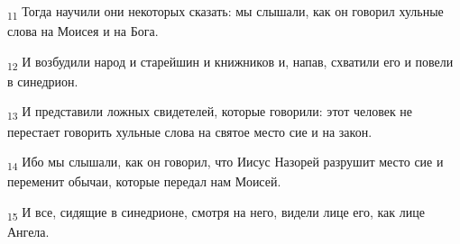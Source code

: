 \begin{tcolorbox}
\textsubscript{11} Тогда научили они некоторых сказать: мы слышали, как он говорил хульные слова на Моисея и на Бога.
\end{tcolorbox}
\begin{tcolorbox}
\textsubscript{12} И возбудили народ и старейшин и книжников и, напав, схватили его и повели в синедрион.
\end{tcolorbox}
\begin{tcolorbox}
\textsubscript{13} И представили ложных свидетелей, которые говорили: этот человек не перестает говорить хульные слова на святое место сие и на закон.
\end{tcolorbox}
\begin{tcolorbox}
\textsubscript{14} Ибо мы слышали, как он говорил, что Иисус Назорей разрушит место сие и переменит обычаи, которые передал нам Моисей.
\end{tcolorbox}
\begin{tcolorbox}
\textsubscript{15} И все, сидящие в синедрионе, смотря на него, видели лице его, как лице Ангела.
\end{tcolorbox}
